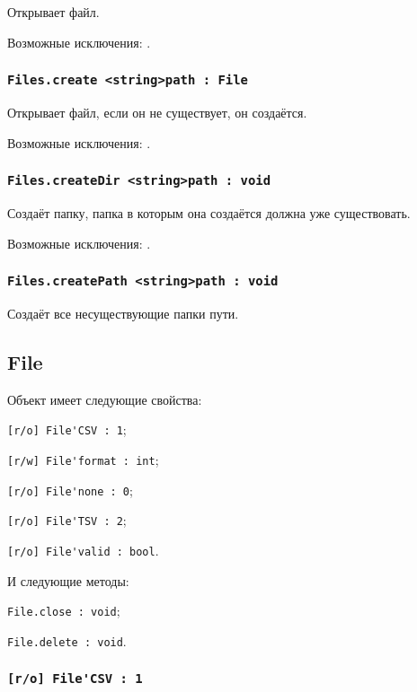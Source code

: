 Открывает файл.

Возможные исключения: .

\subsubsection{\lstinline|Files.create <string>path : File|}

Открывает файл, если он не существует, он создаётся.

Возможные исключения: .

\subsubsection{\lstinline|Files.createDir <string>path : void|}

Создаёт папку, папка в которым она создаётся должна уже существовать.

Возможные исключения: .

\subsubsection{\lstinline|Files.createPath <string>path : void|}

Создаёт все несуществующие папки пути.

\subsection{{\color{orange} File}}

Объект \file{} имеет следующие свойства:
\begin{icItems}
	\item \lstinline|[r/o] File'CSV : 1|;
	\item \lstinline|[r/w] File'format : int|;
	\item \lstinline|[r/o] File'none : 0|;
	\item \lstinline|[r/o] File'TSV : 2|;
	\item \lstinline|[r/o] File'valid : bool|.
\end{icItems}

И следующие методы:
\begin{icItems}
	\item \lstinline|File.close : void|;
	\item \lstinline|File.delete : void|.
\end{icItems}

\subsubsection{\lstinline|[r/o] File'CSV : 1|}

